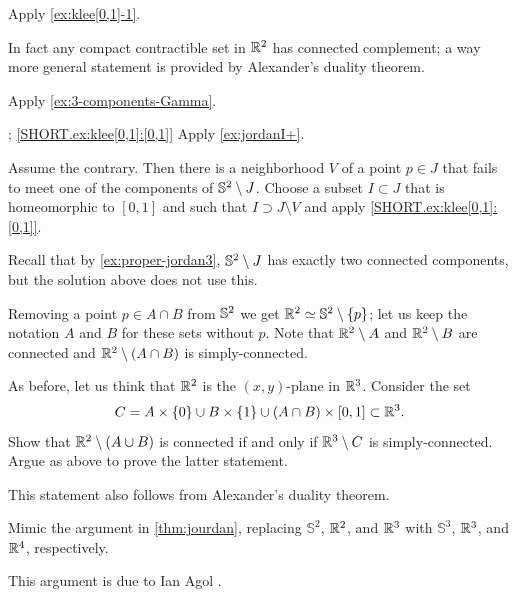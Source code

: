 Apply \ref{ex:klee[0,1]-1}.

In fact any compact contractible set in $\mathbb{R}^2$ has connected complement;
a way more general statement is provided by Alexander's duality theorem.

 Apply \ref{ex:3-components-Gamma}.


\parbf{\ref{ex:klee[0,1]}}; \ref{SHORT.ex:klee[0,1]:[0,1]} Apply \ref{ex:jordanI+}.

Assume the contrary.
Then there is a neighborhood $V$ of a point $p\in J$ that fails to meet one of the components of $\mathbb{S}^2\setminus J$.
Choose a subset $I\subset J$ that is homeomorphic to $[0,1]$ and such that $I\supset J\setminus V$ and apply \ref{SHORT.ex:klee[0,1]:[0,1]}.

 Recall that by \ref{ex:proper-jordan3}, $\mathbb{S}^2\setminus J$ has exactly two connected components, but the solution above does not use this.

Removing a point $p\in A\cap B$ from $\mathbb{S}^2$ we get $\mathbb{R}^2\simeq\mathbb{S}^2\setminus \{p\}$; let us keep the notation $A$ and $B$ for these sets without $p$.
Note that $\mathbb{R}^2\setminus A$ and $\mathbb{R}^2\setminus B$ are connected and $\mathbb{R}^2\setminus (A\cap B)$ is simply-connected.

As before, let us think that $\mathbb{R}^2$ is the $(x,y)$-plane in $\mathbb{R}^3$.
Consider the set
\[C=A\times\{0\}\cup B\times\{1\}\cup (A\cap B)\times [0,1]\subset \mathbb{R}^3.\]
Show that $\mathbb{R}^2\setminus(A\cup B)$ is connected if and only if $\mathbb{R}^3\setminus C$ is simply-connected.
Argue as above to prove the latter statement.

This statement also follows from Alexander's duality theorem.

Mimic the argument in \ref{thm:jourdan}, replacing $\mathbb{S}^2$, $\mathbb{R}^2$, and $\mathbb{R}^3$ with $\mathbb{S}^3$, $\mathbb{R}^3$, and $\mathbb{R}^4$, respectively.

 This argument is due to Ian Agol \cite{agol}.




\spell{\end{multicols}}{}
